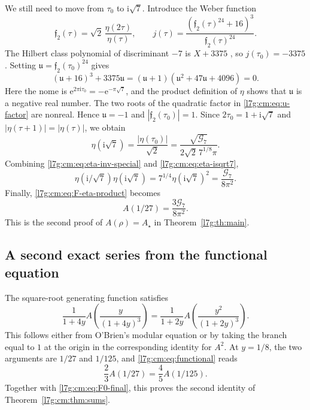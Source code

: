 \documentclass[11pt,letterpaper]{article}
\theoremstyle{remark}\newtheorem{remark}[theorem]{Remark}
\newcommand{\G}{\mathcal G_7}\newcommand{\Ast}{A_\star}
\newcommand{\ii}{\mathrm i}\newcommand{\ee}{\mathrm e}
\newcounter{l7gtrsavedeq}
\begin{document}
We still need to move from $\tau_0$ to $\ii\sqrt7$. Introduce the Weber
function
\begin{equation}\label{l7g:cm:eq:f2}
 \mathfrak f_2(\tau)=\sqrt2\,\frac{\eta(2\tau)}{\eta(\tau)},
 \qquad
 j(\tau)=\frac{(\mathfrak f_2(\tau)^{24}+16)^3}
 {\mathfrak f_2(\tau)^{24}}.
\end{equation}
The Hilbert class polynomial of discriminant $-7$ is $X+3375$
\cite{l7g:cox}, so $j(\tau_0)=-3375$. Setting
$\mathfrak u=\mathfrak f_2(\tau_0)^{24}$ gives
\begin{equation}\label{l7g:cm:eq:u-factor}
 (\mathfrak u+16)^3+3375\mathfrak u
 =(\mathfrak u+1)(\mathfrak u^2+47\mathfrak u+4096)=0.
\end{equation}
Here the nome is $\ee^{2\pi\ii\tau_0}=-\ee^{-\pi\sqrt7}$, and the product
definition of $\eta$ shows that $\mathfrak u$ is a negative real number.
The two roots of the quadratic factor in \eqref{l7g:cm:eq:u-factor} are
nonreal. Hence $\mathfrak u=-1$ and $|\mathfrak f_2(\tau_0)|=1$. Since
$2\tau_0=1+\ii\sqrt7$ and $|\eta(\tau+1)|=|\eta(\tau)|$, we obtain
\begin{equation}\label{l7g:cm:eq:eta-isqrt7}
 \eta(\ii\sqrt7)=\frac{|\eta(\tau_0)|}{\sqrt2}
 =\frac{\sqrt{\G}}
 {2\sqrt2\,7^{1/8}\pi}.
\end{equation}
Combining \eqref{l7g:cm:eq:eta-inv-special} and \eqref{l7g:cm:eq:eta-isqrt7},
\begin{equation}\label{l7g:cm:eq:eta-product-exact}
 \eta(\ii/\sqrt7)\eta(\ii\sqrt7)
 =7^{1/4}\eta(\ii\sqrt7)^2
 =\frac{\G}{8\pi^2}.
\end{equation}
Finally, \eqref{l7g:cm:eq:F-eta-product} becomes
\begin{equation}\label{l7g:cm:eq:F0-final}
 \boxed{\displaystyle
 A(1/27)=\frac{3\G}{8\pi^2}.}
\end{equation}
This is the second proof of $A(\rho)=\Ast$ in Theorem~\ref{l7g:th:main}.

\subsection{A second exact series from the functional equation}\label{l7g:cm:sec:functional}
The square-root generating function satisfies
\begin{equation}\label{l7g:cm:eq:functional}
 \frac1{1+4y}A\!\left(\frac{y}{(1+4y)^3}\right)
 =\frac1{1+2y}A\!\left(\frac{y^2}{(1+2y)^3}\right).
\end{equation}
This follows either from O'Brien's modular equation or by taking the
branch equal to $1$ at the origin in the corresponding identity for
$A^2$. At $y=1/8$, the two arguments are $1/27$ and $1/125$, and
\eqref{l7g:cm:eq:functional} reads
\[
 \frac23A(1/27)=\frac45A(1/125).
\]
Together with \eqref{l7g:cm:eq:F0-final}, this proves the second identity
of Theorem~\ref{l7g:cm:thm:sums}.
\end{document}
